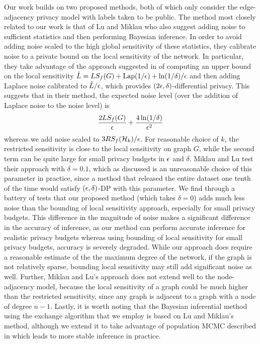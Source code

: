 Our work builds on two proposed methods, both of which only consider the edge-adjacency privacy model with labels taken to be public. The method most closely related to our work is that of Lu and Miklau \cite{LM14} who also suggest adding noise to sufficient statistics and then performing Bayesian inference. In order to avoid adding noise scaled to the high global sensitivity of these statistics, they calibrate noise to a private bound on the local sensitivity of the network. In particular, they take advantage of the approach suggested in \cite{KRSY14} of computing an upper bound on the local sensitivity $\hat{L} = LS_f(G) + \text{Lap}(1/ \epsilon) + \ln(1/\delta)/\epsilon$ and then adding Laplace noise calibrated to  $\hat{L}/ \epsilon$, which provides $(2\epsilon, \delta)$-differential privacy. This suggests that in their method, the expected noise level (over the addition of Laplace noise to the noise level) is $$\frac{2 LS_f(G)}{\epsilon} + \frac{4 \ln (1/\delta)}{\epsilon^2}$$ whereas we add noise scaled to $3RS_f(\mathcal{H}_k)/\epsilon$. For reasonable choice of $k$, the restricted sensitivity is close to the local sensitivity on graph $G$, while the second term can be quite large for small privacy budgets in $\epsilon$ and $\delta$. Miklau and Lu test their approach with $\delta = 0.1$, which as discussed is an unreasonable choice of this parameter in practice, since a method that released the entire dataset one tenth of the time would satisfy $(\epsilon, \delta)$-DP with this parameter. We find through a battery of tests that our proposed method (which takes $\delta = 0$) adds much less noise than the bounding of local sensitivity approach, especially for small privacy budgets. This difference in the magnitude of noise makes a significant difference in the accuracy of inference, as our method can perform accurate inference for realistic privacy budgets whereas using bounding of local sensitivity for small privacy budgets, accuracy is severely degraded. While our approach does require a reasonable estimate of the the maximum degree of the network, if the graph is not relatively sparse, bounding local sensitivity may still add significant noise as well. Further, Miklau and Lu's approach does not extend well to the node-adjacency model, because the local sensitivity of a graph could be much higher than the restricted sensitivity, since any graph is adjacent to a graph with a node of degree $n-1$. Lastly, it is worth noting that the Bayesian inferential method using the exchange algorithm that we employ is based on Lu and Miklau's method, although we extend it to take advantage of population MCMC described in  which leads to more stable inference in practice.

